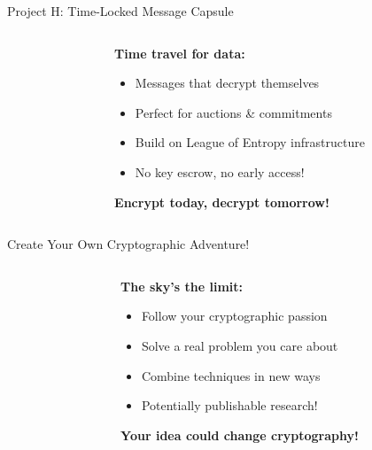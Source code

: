 \documentclass[aspectratio=169, lualatex, handout]{beamer}
\begin{document}
\begin{frame}{Project H: Time-Locked Message Capsule}
	\begin{columns}[c]
		\begin{column}{0.5\textwidth}
		\end{column}
		\begin{column}{0.5\textwidth}
			\textbf{Time travel for data:}
			\begin{itemize}[<+->]
				\item Messages that decrypt themselves
				\item Perfect for auctions \& commitments
				\item Build on League of Entropy infrastructure
				\item No key escrow, no early access!
			\end{itemize}
			\vspace{0.5cm}
			\textcolor{cipherprimary}{\textbf{Encrypt today, decrypt tomorrow!}}
		\end{column}
	\end{columns}
\end{frame}

\begin{frame}{Create Your Own Cryptographic Adventure!}
	\begin{columns}[c]
		\begin{column}{0.5\textwidth}
		\end{column}
		\begin{column}{0.5\textwidth}
			\textbf{The sky's the limit:}
			\begin{itemize}[<+->]
				\item Follow your cryptographic passion
				\item Solve a real problem you care about
				\item Combine techniques in new ways
				\item Potentially publishable research!
			\end{itemize}
			\vspace{0.5cm}
			\textcolor{cipherprimary}{\textbf{Your idea could change cryptography!}}
		\end{column}
	\end{columns}
\end{frame}
\end{document}
